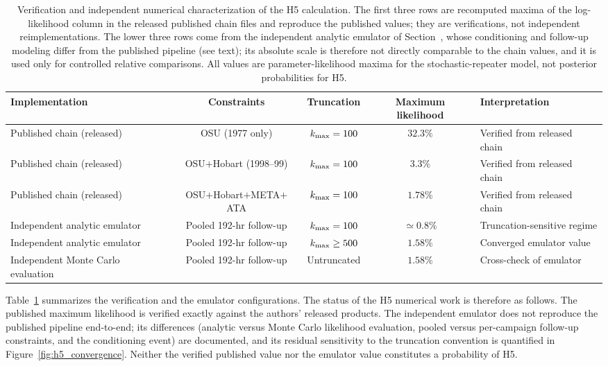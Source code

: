 \documentclass[twocolumn]{aastex701}
\newcommand{\kmax}{k_{\rm max}}
\begin{document}
\begin{table}[ht!]
\centering
\caption{Verification and independent numerical characterization of the H5 calculation. The first three rows are recomputed maxima of the log-likelihood column in the released published chain files \citep{kipping2022code} and reproduce the published values; they are verifications, not independent reimplementations. The lower three rows come from the independent analytic emulator of Section~, whose conditioning and follow-up modeling differ from the published pipeline (see text); its absolute scale is therefore not directly comparable to the chain values, and it is used only for controlled relative comparisons. All values are parameter-likelihood maxima for the stochastic-repeater model, not posterior probabilities for H5.}
\label{tab:h5_recon}
\small
\setlength{\tabcolsep}{4pt}
\begin{tabular}{@{}lccc>{\raggedright\arraybackslash}p{}@{}}
\toprule
Implementation & Constraints & Truncation & Maximum likelihood & Interpretation \\
\midrule
Published chain (released) & OSU (1977 only) & $\kmax=100$ & $32.3\%$ & Verified from released chain \\
Published chain (released) & OSU$+$Hobart (1998--99) & $\kmax=100$ & $3.3\%$ & Verified from released chain \\
Published chain (released) & OSU$+$Hobart$+$META$+$ATA & $\kmax=100$ & $1.78\%$ & Verified from released chain \\
Independent analytic emulator & Pooled 192-hr follow-up & $\kmax=100$ & $\simeq0.8\%$ & Truncation-sensitive regime \\
Independent analytic emulator & Pooled 192-hr follow-up & $\kmax\geq500$ & $1.58\%$ & Converged emulator value \\
Independent Monte Carlo evaluation & Pooled 192-hr follow-up & Untruncated & $1.58\%$ & Cross-check of emulator \\
\bottomrule
\end{tabular}
\end{table}

Table~\ref{tab:h5_recon} summarizes the verification and the emulator configurations. The status of the H5 numerical work is therefore as follows. The published maximum likelihood is verified exactly against the authors' released products. The independent emulator does not reproduce the published pipeline end-to-end; its differences (analytic versus Monte Carlo likelihood evaluation, pooled versus per-campaign follow-up constraints, and the conditioning event) are documented, and its residual sensitivity to the truncation convention is quantified in Figure~\ref{fig:h5_convergence}. Neither the verified published value nor the emulator value constitutes a probability of H5.
\end{document}

